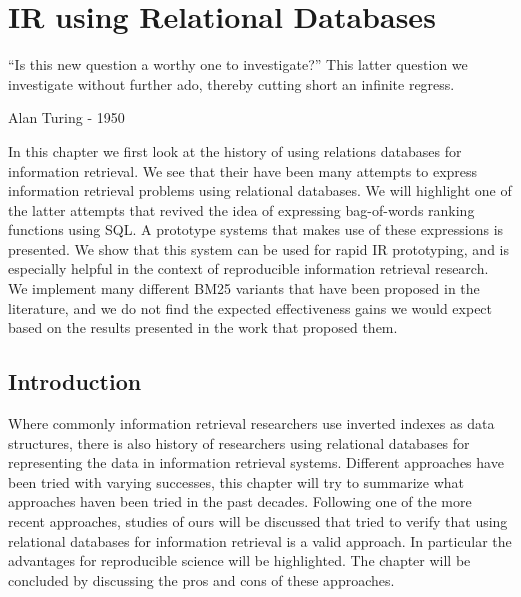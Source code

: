 \chapter{IR using Relational Databases}
\label{ir-using-relational-databases}
\epigraph{``Is this new question a worthy one to investigate?'' This latter question we investigate without further ado, thereby cutting short an infinite regress.}{Alan Turing - 1950}

\begin{Abstract}
\begin{changemargin}{1cm}{1cm}
	In this chapter we first look at the history of using relations databases for information retrieval. We see that their have been many attempts to express information retrieval problems using relational databases. We will highlight one of the latter attempts that revived the idea of expressing bag-of-words ranking functions using SQL. A prototype systems that makes use of these expressions is presented. We show that this system can be used for rapid IR prototyping, and is especially helpful in the context of reproducible information retrieval research.
	We implement many different BM25 variants that have been proposed in the literature, and we do not find the expected effectiveness gains we would expect based on the results presented in the work that proposed them.  
\end{changemargin}
\end{Abstract}


\section{Introduction}
Where commonly information retrieval researchers use inverted indexes as data structures, there is also history of researchers using relational databases for representing the data in information retrieval systems. Different approaches have been tried with varying successes, this chapter will try to summarize what approaches haven been tried in the past decades. Following one of the more recent approaches, studies of ours will be discussed that tried to verify that using relational databases for information retrieval is a valid approach. In particular the advantages for reproducible science will be highlighted. The chapter will be concluded by discussing the pros and cons of these approaches. 

